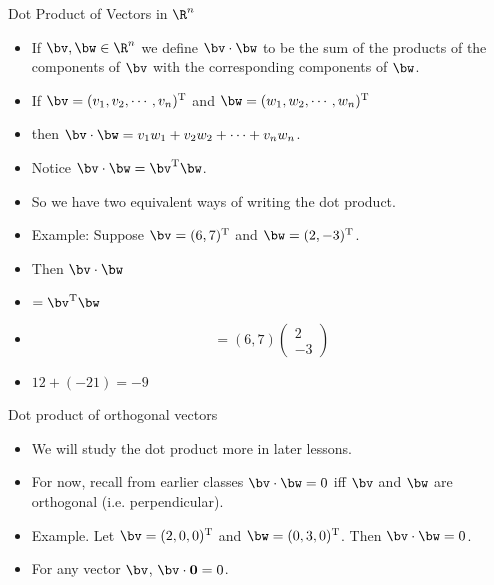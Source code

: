 \documentclass{beamer}
\begin{document}
\begin{frame}{Dot Product of Vectors in $\R^n$}

\begin{itemize}
\item If $\bv, \bw \in \R^n$ we define $\bv \cdot \bw$ to be the sum of the products of the components of $\bv$ with the corresponding components of $\bw$.
\item If $\bv=(v_1, v_2, \cdots , v_n)^{\text{T}}$ and $\bw=(w_1, w_2, \cdots, w_n)^{\text{T}}$
\item then $\bv \cdot \bw = v_1  w_1 +  v_2  w_2 + \cdots +  v_n  w_n$.
\item Notice $\bv \cdot \bw = \bv^{\text{T}} \bw$.
\item So we have two equivalent ways of writing the dot product.
\item Example: Suppose $\bv = (6, 7)^{\text{T}}$ and $\bw=(2, -3)^{\text{T}}$.
\item Then $\bv \cdot \bw$
\item $=\bv^{\text{T}} \bw$
\item
$$
= (6, 7) \begin{pmatrix} 2 \\ -3 \end{pmatrix}
$$
\item $12 + (-21) = -9$
\end{itemize}

\end{frame}

\begin{frame}{Dot product of orthogonal vectors}

\begin{itemize}
\item We will study the dot product more in later lessons.
\item For now, recall from earlier classes $\bv \cdot \bw = 0$ iff
$\bv$ and $\bw$ are orthogonal (i.e. perpendicular).
\item Example. Let $\bv=(2, 0, 0)^{\text{T}}$ and $\bw = (0, 3, 0)^{\text{T}}$.
Then $\bv \cdot \bw = 0$.
\item For any vector $\bv$, $\bv \cdot \mathbf{0} = 0$.
\end{itemize}

\end{frame}
\end{document}
